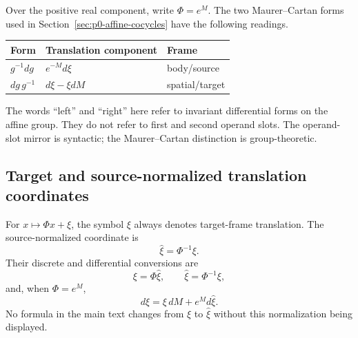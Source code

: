 Over the positive real component, write $\Phi=e^M$.  The two
Maurer--Cartan forms used in Section~\ref{sec:p0-affine-cocycles} have the
following readings.

\begin{center}
\begin{tabular}{lll}
\toprule
Form & Translation component & Frame \\
\midrule
$g^{-1}dg$ & $e^{-M}d\xi$ & body/source \\
$dg\,g^{-1}$ & $d\xi-\xi dM$ & spatial/target \\
\bottomrule
\end{tabular}
\end{center}

The words ``left'' and ``right'' here refer to invariant differential forms on
the affine group.  They do not refer to first and second operand slots.  The
operand-slot mirror is syntactic; the Maurer--Cartan distinction is
group-theoretic.

\subsection{Target and source-normalized translation coordinates}

For $x\mapsto\Phi x+\xi$, the symbol $\xi$ always denotes target-frame
translation.  The source-normalized coordinate is
\[
  \widehat\xi=\Phi^{-1}\xi.
\]
Their discrete and differential conversions are
\[
  \xi=\Phi\widehat\xi,
  \qquad
  \widehat\xi=\Phi^{-1}\xi,
\]
and, when $\Phi=e^M$,
\[
  d\xi=\xi\,dM+e^M d\widehat\xi.
\]
No formula in the main text changes from $\xi$ to $\widehat\xi$ without this
normalization being displayed.

